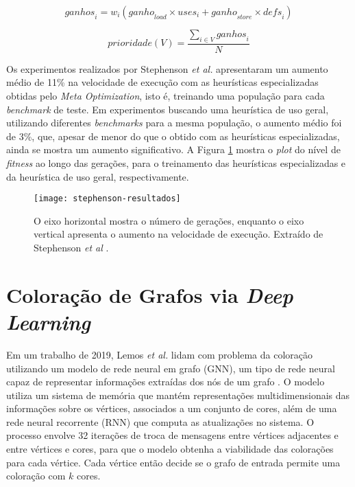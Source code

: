 \documentclass[
	12pt,				%
	openright,			%
	oneside,			%
	a4paper,			%
	tccpreliminar,			%
	]{ABNT-DC-UEL}
\begin{document}
\begin{equation}
    \mathit{ganhos}_i = w_i (\mathit{ganho}_{\mathit{load}} \times \mathit{uses}_i + \mathit{ganho}_{\mathit{store}} \times \mathit{defs}_i)
    \label{eq:stephenson-1}
\end{equation}

\begin{equation}
    \mathit{prioridade}(V) = \frac{\sum_{i \in V} \mathit{ganhos}_i}{N}
    \label{eq:stephenson-2}
\end{equation}

Os experimentos realizados por Stephenson \textit{et al.} apresentaram um aumento médio de 11\% na velocidade de execução com as heurísticas especializadas obtidas pelo \textit{Meta Optimization}, isto é, treinando uma população para cada \textit{benchmark} de teste. Em experimentos buscando uma heurística de uso geral, utilizando diferentes \textit{benchmarks} para a mesma população, o aumento médio foi de 3\%, que, apesar de menor do que o obtido com as heurísticas especializadas, ainda se mostra um aumento significativo. A Figura \ref{fig:stephenson-resultados} mostra o \textit{plot} do nível de \textit{fitness} ao longo das gerações, para o treinamento das heurísticas especializadas e da heurística de uso geral, respectivamente.

\begin{figure}[hbt]
    \centering
    \texttt{[image: stephenson-resultados]}
    \caption{O eixo horizontal mostra o número de gerações, enquanto o eixo vertical apresenta o aumento na velocidade de execução. Extraído de Stephenson \textit{et al} \cite{amarasinghe:03}.}
    \label{fig:stephenson-resultados}
\end{figure}

\section{Coloração de Grafos via \textit{Deep Learning}} \label{sec:coloracao-deep-learning}

Em um trabalho de 2019, Lemos \textit{et al.} \cite{lemos:19} lidam com problema da coloração utilizando um modelo de rede neural em grafo (GNN), um tipo de rede neural capaz de representar informações extraídas dos nós de um grafo \cite{scarselli:09}. O modelo utiliza um sistema de memória que mantém representações multidimensionais das informações sobre os vértices, associados a um conjunto de cores, além de uma rede neural recorrente (RNN) que computa as atualizações no sistema. O processo envolve 32 iterações de troca de mensagens entre vértices adjacentes e entre vértices e cores, para que o modelo obtenha a viabilidade das colorações para cada vértice. Cada vértice então decide se o grafo de entrada permite uma coloração com $k$ cores.
\end{document}
